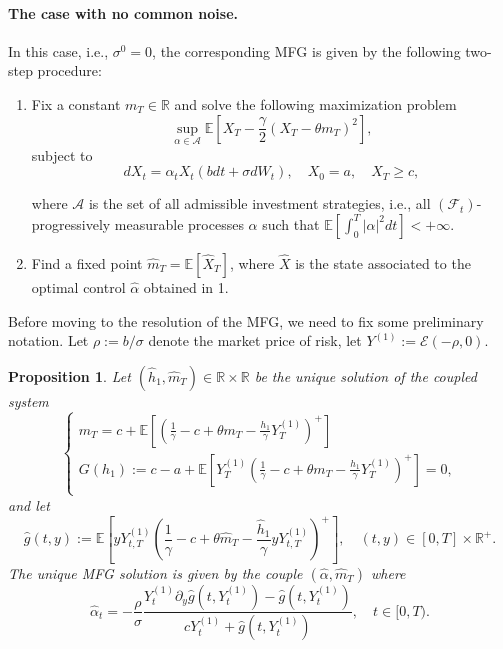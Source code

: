\documentclass[11pt,a4paper]{article}
\newtheorem{prop}[theo]{Proposition}
\begin{document}
\paragraph{The case with no common noise.} In this case, i.e., $\sigma^0 =0$, the corresponding MFG is given by the following two-step procedure:
\begin{enumerate}

\item Fix a constant $ m_T \in \mathbb R$ and solve the following maximization problem
\[ \sup_{\alpha \in \mathcal A} \mathbb E\left[ X_T -\frac{\gamma}{2}(X_T - \theta m_T)^2  \right], \]
subject to
\begin{equation}
\label{sde oi}
    dX_t = \alpha_t X_t (b dt + \sigma dW_t ), \quad X_0=a, \quad X_T \geq c,
\end{equation}

where $\mathcal A$ is the set of all admissible investment strategies, i.e., all $(\mathcal F_t)$-progressively measurable processes $\alpha$ such that $\mathbb E\left[\int_0 ^T |\alpha|^2 dt \right] < + \infty$.

\item Find a fixed point $\hat m_T = \mathbb E[\hat X_T]$, where $\hat X$ is the state associated to the optimal control $\hat \alpha$ obtained in 1.
\end{enumerate}
Before moving to the resolution of the MFG, we need to fix some preliminary notation. Let $\rho := b/\sigma$ denote the market price of risk, let $Y^{(1)} := \mathcal E(-\rho,0)$.
\begin{prop}\label{prop:application1}
Let $(\hat h_1, \hat m_T) \in \mathbb R \times \mathbb R$ be the unique solution of the coupled system 
\begin{equation} \label{eq:h1}
\begin{cases}
 m_T = c + \mathbb{E} \left[ \left( \frac{1}{\gamma}-c+\theta m_T - \frac{h_1}{\gamma} Y_T^{(1)} \right)^{+} \right]\\
    G(h_1):= c -a+ \mathbb{E} \left[ Y_T^{(1)} \left( \frac{1}{\gamma}-c+\theta m_T - \frac{h_1}{\gamma} Y_T^{(1)} \right)^{+} \right]=0,\\
\end{cases}
\end{equation} 
 and let
\[ \hat g(t,y) := \mathbb{E}\!\left[ yY^{(1)}_{t,T} \left(\frac{1}{\gamma}-c+\theta \hat{m}_T- \frac{\hat h_1 }{\gamma}yY^{(1)}_{t,T} \right)^+ \right], \quad (t,y)\in [0,T]\times \mathbb R^+.\]
 The unique MFG solution is given by the couple $(\hat \alpha, \hat m_T)$ where
$$\hat\alpha_t=-\frac{\rho}{\sigma}
\dfrac{Y^{(1)}_t\partial_{y}\hat g(t, Y^{(1)}_t) - \hat g(t,Y^{(1)}_t)}{cY^{(1)}_t+\hat g(t, Y^{(1)}_t)}, \quad t\in [0,T).$$
\end{prop}
\end{document}

